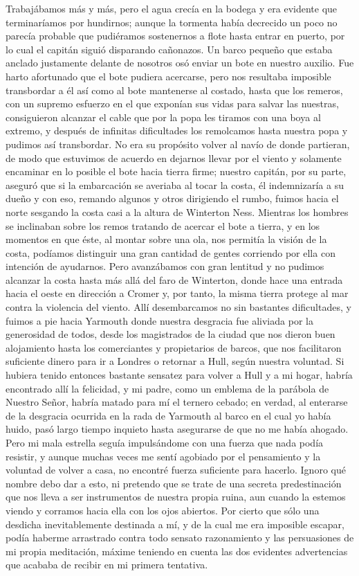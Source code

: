 \documentclass{novela}
\begin{document}
    Trabajábamos más y más, pero el agua crecía en la bodega y era evidente que terminaríamos por hundirnos; aunque la tormenta había decrecido un poco no parecía probable que pudiéramos sostenernos a flote hasta entrar en puerto, por lo cual el capitán siguió disparando cañonazos. Un barco pequeño que estaba anclado justamente delante de nosotros osó enviar un bote en nuestro auxilio. Fue harto afortunado que el bote pudiera acercarse, pero nos resultaba imposible transbordar a él así como al bote mantenerse al costado, hasta que los remeros, con un supremo esfuerzo en el que exponían sus vidas para salvar las nuestras, consiguieron alcanzar el cable que por la popa les tiramos con una boya al extremo, y después de infinitas dificultades los remolcamos hasta nuestra popa y pudimos así transbordar. No era su propósito volver al navío de donde partieran, de modo que estuvimos de acuerdo en dejarnos llevar por el viento y solamente encaminar en lo posible el bote hacia tierra firme; nuestro capitán, por su parte, aseguró que si la embarcación se averiaba al tocar la costa, él indemnizaría a su dueño y con eso, remando algunos y otros dirigiendo el rumbo, fuimos hacia el norte sesgando la costa casi a la altura de Winterton Ness.
    Mientras los hombres se inclinaban sobre los remos tratando de acercar el bote a tierra, y en los momentos en que éste, al montar sobre una ola, nos permitía la visión de la costa, podíamos distinguir una gran cantidad de gentes corriendo por ella con intención de ayudarnos. Pero avanzábamos con gran lentitud y no pudimos alcanzar la costa hasta más allá del faro de Winterton, donde hace una entrada hacia el oeste en dirección a Cromer y, por tanto, la misma tierra protege al mar contra la violencia del viento. Allí desembarcamos no sin bastantes dificultades, y fuimos a pie hacia Yarmouth donde nuestra desgracia fue aliviada por la generosidad de todos, desde los magistrados de la ciudad que nos dieron buen alojamiento hasta los comerciantes y propietarios de barcos, que nos facilitaron suficiente dinero para ir a Londres o retornar a Hull, según nuestra voluntad.
    Si hubiera tenido entonces bastante sensatez para volver a Hull y a mi hogar, habría encontrado allí la felicidad, y mi padre, como un emblema de la parábola de Nuestro Señor, habría matado para mí el ternero cebado; en verdad, al enterarse de la desgracia ocurrida en la rada de Yarmouth al barco en el cual yo había huido, pasó largo tiempo inquieto hasta asegurarse de que no me había ahogado.
    Pero mi mala estrella seguía impulsándome con una fuerza que nada podía resistir, y aunque muchas veces me sentí agobiado por el pensamiento y la voluntad de volver a casa, no encontré fuerza suficiente para hacerlo. Ignoro qué nombre debo dar a esto, ni pretendo que se trate de una secreta predestinación que nos lleva a ser instrumentos de nuestra propia ruina, aun cuando la estemos viendo y corramos hacia ella con los ojos abiertos. Por cierto que sólo una desdicha inevitablemente destinada a mí, y de la cual me era imposible escapar, podía haberme arrastrado contra todo sensato razonamiento y las persuasiones de mi propia meditación, máxime teniendo en cuenta las dos evidentes advertencias que acababa de recibir en mi primera tentativa.
\end{document}
